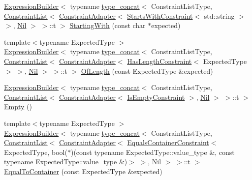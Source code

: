 \begin{DoxyCompactItemize}
\item 
\mbox{\hyperlink{structsnowhouse_1_1ExpressionBuilder}{Expression\+Builder}}$<$ typename \mbox{\hyperlink{structsnowhouse_1_1type__concat}{type\+\_\+concat}}$<$ Constraint\+List\+Type, \mbox{\hyperlink{structsnowhouse_1_1ConstraintList}{Constraint\+List}}$<$ \mbox{\hyperlink{structsnowhouse_1_1ConstraintAdapter}{Constraint\+Adapter}}$<$ \mbox{\hyperlink{structsnowhouse_1_1StartsWithConstraint}{Starts\+With\+Constraint}}$<$ std\+::string $>$ $>$, \mbox{\hyperlink{structsnowhouse_1_1Nil}{Nil}} $>$ $>$\+::t $>$ \mbox{\hyperlink{structsnowhouse_1_1ExpressionBuilder_ab11b42520d16f32c8ec7a3bbc0ddc302}{Starting\+With}} (const char $\ast$expected)
\item 
{\footnotesize template$<$typename Expected\+Type $>$ }\\\mbox{\hyperlink{structsnowhouse_1_1ExpressionBuilder}{Expression\+Builder}}$<$ typename \mbox{\hyperlink{structsnowhouse_1_1type__concat}{type\+\_\+concat}}$<$ Constraint\+List\+Type, \mbox{\hyperlink{structsnowhouse_1_1ConstraintList}{Constraint\+List}}$<$ \mbox{\hyperlink{structsnowhouse_1_1ConstraintAdapter}{Constraint\+Adapter}}$<$ \mbox{\hyperlink{structsnowhouse_1_1HasLengthConstraint}{Has\+Length\+Constraint}}$<$ Expected\+Type $>$ $>$, \mbox{\hyperlink{structsnowhouse_1_1Nil}{Nil}} $>$ $>$\+::t $>$ \mbox{\hyperlink{structsnowhouse_1_1ExpressionBuilder_a21d8f0155d2c27b9fb6b6d2f67c7fb69}{Of\+Length}} (const Expected\+Type \&expected)
\item 
\mbox{\hyperlink{structsnowhouse_1_1ExpressionBuilder}{Expression\+Builder}}$<$ typename \mbox{\hyperlink{structsnowhouse_1_1type__concat}{type\+\_\+concat}}$<$ Constraint\+List\+Type, \mbox{\hyperlink{structsnowhouse_1_1ConstraintList}{Constraint\+List}}$<$ \mbox{\hyperlink{structsnowhouse_1_1ConstraintAdapter}{Constraint\+Adapter}}$<$ \mbox{\hyperlink{structsnowhouse_1_1IsEmptyConstraint}{Is\+Empty\+Constraint}} $>$, \mbox{\hyperlink{structsnowhouse_1_1Nil}{Nil}} $>$ $>$\+::t $>$ \mbox{\hyperlink{structsnowhouse_1_1ExpressionBuilder_a9ce6452a49102df200f1f7f24b4f2604}{Empty}} ()
\item 
{\footnotesize template$<$typename Expected\+Type $>$ }\\\mbox{\hyperlink{structsnowhouse_1_1ExpressionBuilder}{Expression\+Builder}}$<$ typename \mbox{\hyperlink{structsnowhouse_1_1type__concat}{type\+\_\+concat}}$<$ Constraint\+List\+Type, \mbox{\hyperlink{structsnowhouse_1_1ConstraintList}{Constraint\+List}}$<$ \mbox{\hyperlink{structsnowhouse_1_1ConstraintAdapter}{Constraint\+Adapter}}$<$ \mbox{\hyperlink{structsnowhouse_1_1EqualsContainerConstraint}{Equals\+Container\+Constraint}}$<$ Expected\+Type, bool($\ast$)(const typename Expected\+Type\+::value\+\_\+type \&, const typename Expected\+Type\+::value\+\_\+type \&)$>$ $>$, \mbox{\hyperlink{structsnowhouse_1_1Nil}{Nil}} $>$ $>$\+::t $>$ \mbox{\hyperlink{structsnowhouse_1_1ExpressionBuilder_af215471e68bff7147af608e1ee7e67c9}{Equal\+To\+Container}} (const Expected\+Type \&expected)

\end{DoxyCompactItemize}
